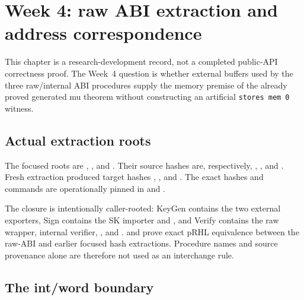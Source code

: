 \section{Week 4: raw ABI extraction and address correspondence}

This chapter is a research-development record, not a completed public-API
correctness proof.  The Week~4 question is whether external buffers used by
the three raw/internal ABI procedures supply the memory premise of the already
proved generated mu theorem without constructing an artificial
\texttt{stores mem 0} witness.

\subsection{Actual extraction roots}

The focused roots are
,
, and
.  Their source hashes are,
respectively,
,
, and
.  Fresh extraction produced target hashes
,
, and
.  The exact hashes and commands are operationally
pinned in  and
.

The closure is intentionally caller-rooted: KeyGen contains the two external
exporters, Sign contains the SK importer and , and
Verify contains the raw wrapper, internal verifier,
, and .
 and
 prove exact pRHL equivalence
between the raw-ABI and earlier focused hash extractions.  Procedure names and
source provenance alone are therefore not used as an interchange rule.

\subsection{The int/word boundary}

